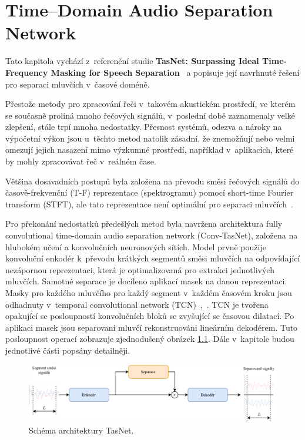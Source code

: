 \chapter{Time--Domain Audio Separation Network}
\label{tasnet}

Tato kapitola vychází z~referenční studie \textbf{TasNet: Surpassing Ideal Time-Frequency Masking for Speech Separation}~\cite{luo2018convtasnet} a popisuje její navrhnuté řešení pro separaci mluvčích v~časové doméně.

Přestože metody pro zpracování řeči v~takovém akustickém prostředí, ve kterém se současně prolíná mnoho řečových signálů, v~poslední době zaznamenaly velké zlepšení, stále trpí mnoha nedostatky. Přesnost systémů, odezva a nároky na výpočetní výkon jsou u~těchto metod natolik zásadní, že znemožňují nebo velmi omezují jejich nasazení mimo výzkumné prostředí, například v~aplikacích, které by mohly zpracovávat řeč v~reálném čase.

Většina dosavadních postupů byla založena na převodu směsi řečových signálů do časově-frekvenční (T-F) reprezentace (spektrogramu) pomocí short-time Fourier transform (STFT), ale tato reprezentace není optimální pro separaci mluvčích~\cite{speechseparationoverview}.

Pro překonání nedostatků předešlých metod byla navržena architektura fully convolutional time-domain audio separation network (Conv-TasNet), založena na hlubokém učení a konvolučních neuronových sítích. Model prvně použije konvoluční enkodér k~převodu krátkých segmentů směsi mluvčích na odpovídající nezápornou reprezentaci, která je optimalizovaná pro extrakci jednotlivých mluvčích. Samotné separace je docíleno aplikací masek na danou reprezentaci. Masky pro každého mluvčího pro každý segment v~každém časovém kroku jsou odhadnuty v~temporal convolutional network (TCN)~\cite{lea2016temporal},~\cite{bai2018empirical}. TCN je tvořena opakující se posloupností konvolučních bloků se zvyšující se časovou dilatací. Po aplikaci masek jsou separovaní mluvčí rekonstruováni lineárním dekodérem. Tuto posloupnost operací zobrazuje zjednodušený obrázek \ref{fig:tasnet-pipe}. Dále v~kapitole budou jednotlivé části popsány detailněji.

\begin{figure}[H]
    \centering
    \includegraphics[scale=0.8]{obrazky-figures/tasnet-pipe.pdf}
    \caption{\label{fig:tasnet-pipe}Schéma architektury TasNet.}
\end{figure}


